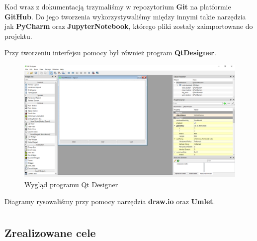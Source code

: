 \documentclass[polish,12pt]{aghthesis}
\begin{document}
Kod wraz z dokumentacją trzymaliśmy w repozytorium \textbf{Git} na platformie \textbf{GitHub}. Do jego tworzenia wykorzystywaliśmy między innymi takie narzędzia jak \textbf{PyCharm} oraz \textbf{JupyterNotebook}, którego pliki zostały zaimportowane do projektu.

Przy tworzeniu interfejsu pomocy był również program \textbf{QtDesigner}.

\begin{figure}[H]
	\centering
	\includegraphics[width=0.8\linewidth]{qt_designer.png}
	\caption{Wygląd programu Qt Designer}
	\label{fig:qt_designer}
\end{figure}

Diagramy rysowaliśmy przy pomocy narzędzia \textbf{draw.io} oraz \textbf{Umlet}.

\section{\SectionTitleResults}
\label{sec:wyniki-projektu}

\subsection{Zrealizowane cele}
\end{document}
